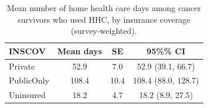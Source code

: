 
\begin{longtable}[t]{lccc}
\caption{\label{tab:tab:days-insurance}Mean number of home health care days among cancer survivors who used HHC, by insurance coverage (survey-weighted).}\\
\toprule
INSCOV & Mean days & SE & 95\%\% CI\\
\midrule
Private & 52.9 & 7.0 & 52.9 (39.1, 66.7)\\
PublicOnly & 108.4 & 10.4 & 108.4 (88.0, 128.7)\\
Uninsured & 18.2 & 4.7 & 18.2 (8.9, 27.5)\\
\bottomrule
\end{longtable}
